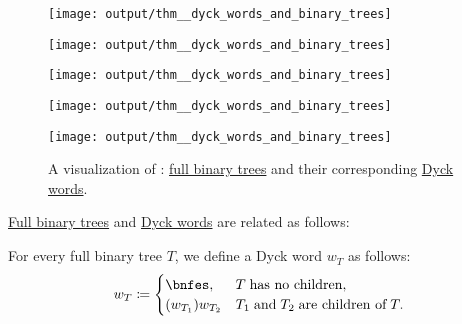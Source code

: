 \begin{corollary}\label{thm:dyck_words_and_binary_trees}
  \begin{figure}[!ht]
    \begin{subcaptionblock}{0.19\textwidth}
      \centering
      \texttt{[image: output/thm\_\_dyck\_words\_and\_binary\_trees]}
      \caption{\texttt{((()))}.}
    \end{subcaptionblock}
    \begin{subcaptionblock}{0.19\textwidth}
      \centering
      \texttt{[image: output/thm\_\_dyck\_words\_and\_binary\_trees]}
      \caption{\texttt{(()())}.}
    \end{subcaptionblock}
    \begin{subcaptionblock}{0.19\textwidth}
      \centering
      \texttt{[image: output/thm\_\_dyck\_words\_and\_binary\_trees]}
      \caption{\texttt{()(())}.}
    \end{subcaptionblock}
    \begin{subcaptionblock}{0.19\textwidth}
      \centering
      \texttt{[image: output/thm\_\_dyck\_words\_and\_binary\_trees]}
      \caption{\texttt{(())()}.}
    \end{subcaptionblock}
    \begin{subcaptionblock}{0.19\textwidth}
      \centering
      \texttt{[image: output/thm\_\_dyck\_words\_and\_binary\_trees]}
      \caption{\texttt{()()()}.}
    \end{subcaptionblock}
    \caption{A visualization of : \hyperref[def:n_ary_tree]{full binary trees} and their corresponding \hyperref[def:dyck_language]{Dyck words}.}\label{fig:thm:dyck_words_and_binary_trees}
  \end{figure}

  \hyperref[def:n_ary_tree]{Full binary trees} and \hyperref[def:dyck_language]{Dyck words} are related as follows:
  \begin{thmenum}
     For every full binary tree \( T \), we define a Dyck word \( w_T \) as follows:
    \begin{equation}\label{eq:thm:dyck_words_and_binary_trees/tree_to_word}
      w_T \coloneqq \begin{cases}
        \bnfes,             &T \T{has no children}, \\
        ( w_{T_1} ) w_{T_2} &T_1 \T{and} T_2 \T{are children of} T.
      \end{cases}
    \end{equation}


\end{thmenum}
\end{corollary}
